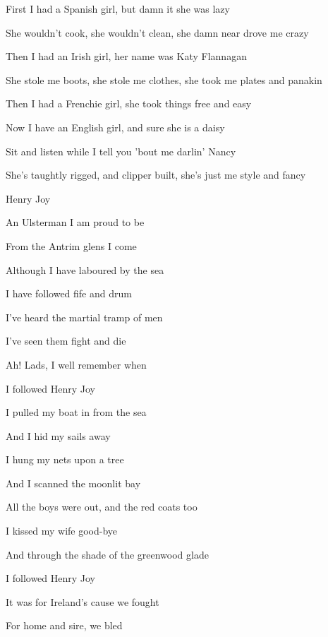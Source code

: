 \documentclass[letterpaper,9pt]{article}
\begin{document}
\hfill

First I had a Spanish girl, but damn it she was lazy

She wouldn't cook, she wouldn't clean, she damn near drove me crazy

\hfill

Then I had an Irish girl, her name was Katy Flannagan

She stole me boots, she stole me clothes, she took me plates and panakin

\hfill

Then I had a Frenchie girl, she took things free and easy

Now I have an English girl, and sure she is a daisy

\hfill

Sit and listen while I tell you 'bout me darlin' Nancy

She's taughtly rigged, and clipper built, she's just me style and fancy

\newpage
{}
\Huge
Henry Joy

\Large

\hfill

An Ulsterman I am proud to be 

From the Antrim glens I come

Although I have laboured by the sea

I have followed fife and drum

I've heard the martial tramp of men

I've seen them fight and die

Ah! Lads, I well remember when

I followed Henry Joy

\hfill

I pulled my boat in from the sea

And I hid my sails away

I hung my nets upon a tree

And I scanned the moonlit bay

All the boys were out, and the red coats too

I kissed my wife good-bye

And through the shade of the greenwood glade

I followed Henry Joy

\hfill

It was for Ireland's cause we fought

For home and sire, we bled
\end{document}
